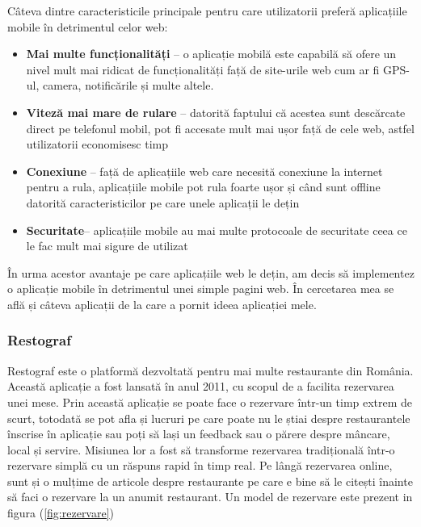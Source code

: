 \documentclass[a4paper,12pt]{book}
\begin{document}
\newpage
Câteva dintre caracteristicile principale pentru care utilizatorii preferă aplicațiile mobile în detrimentul celor web:
\begin{itemize}
        \item \textbf{Mai multe funcționalități} – o aplicație mobilă este capabilă să ofere un nivel mult mai ridicat de funcționalități față de site-urile web cum ar fi GPS-ul, camera, notificările și multe altele.
        \item \textbf {Viteză mai mare de rulare }– datorită faptului că acestea sunt descărcate direct pe telefonul mobil, pot fi accesate mult mai ușor față de cele web, astfel utilizatorii economisesc timp
        \item \textbf{Conexiune} – față de aplicațiile web care necesită conexiune la internet pentru a rula, aplicațiile mobile pot rula foarte ușor și când sunt offline datorită caracteristicilor pe care unele aplicații le dețin
        \item \textbf{Securitate}– aplicațiile mobile au mai multe protocoale de securitate ceea ce le fac mult mai sigure de utilizat
       
    \end{itemize}

În urma acestor avantaje pe care aplicațiile web le dețin, am decis să implementez o aplicație mobile în detrimentul unei simple pagini web. În cercetarea mea se află și câteva aplicații de la care a pornit ideea aplicației mele.
\subsubsection{Restograf}
Restograf    este o platformă dezvoltată pentru mai multe restaurante din România. Această aplicație a fost lansată în anul 2011, cu scopul de a facilita rezervarea unei mese. Prin această aplicație se poate face o rezervare într-un timp extrem de scurt, totodată se pot afla și lucruri pe care poate nu le știai despre restaurantele înscrise în aplicație sau poți să lași un feedback sau o părere despre mâncare, local și servire. Misiunea lor a fost să transforme rezervarea tradițională într-o rezervare simplă cu un răspuns rapid în timp real. Pe lângă rezervarea online, sunt și o mulțime de articole despre restaurante pe care e bine să le citești înainte să faci o rezervare la un anumit restaurant. Un model de rezervare este prezent in figura (\ref{fig:rezervare})
\end{document}
